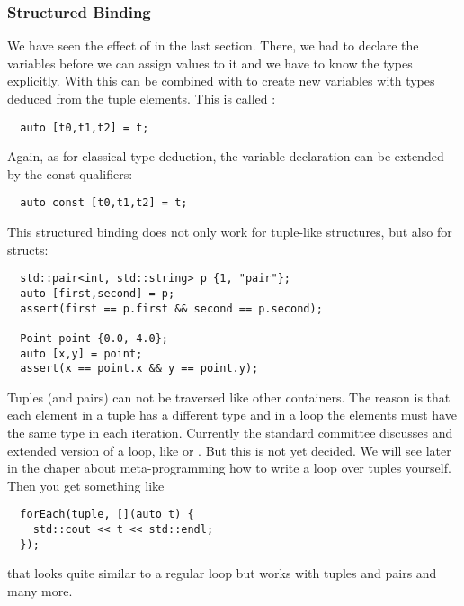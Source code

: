 \subsubsection{Structured Binding}
We have seen the effect of  in the last section. There, we had to declare the variables before we can assign
values to it and we have to know the types explicitly. With\marginpar{[\cxx{17}]}  this can be combined with 
to create new variables with types deduced from the tuple elements. This is called :
%
\begin{verbatim}
  auto [t0,t1,t2] = t;
\end{verbatim}
%
Again, as for classical  type deduction, the variable declaration can be extended by the const
qualifiers:
%
\begin{verbatim}
  auto const [t0,t1,t2] = t;
\end{verbatim}


This structured binding does not only work for tuple-like structures, but also for structs:
%
\begin{verbatim}
  std::pair<int, std::string> p {1, "pair"};
  auto [first,second] = p;
  assert(first == p.first && second == p.second);

  Point point {0.0, 4.0};
  auto [x,y] = point;
  assert(x == point.x && y == point.y);
\end{verbatim}

\begin{rem}
Tuples (and pairs) can not be traversed like other containers. The reason is that each element in a tuple has a different type and in a loop the elements must have the same type in each iteration. Currently the standard committee discusses and extended version of a loop, like  or . But this is not yet decided. We will see later in the chaper about meta-programming how to write a loop over tuples yourself. Then you get something like
\begin{verbatim}
  forEach(tuple, [](auto t) {
    std::cout << t << std::endl;
  });
\end{verbatim}
that looks quite similar to a regular loop but works with tuples and pairs and many more.
\end{rem}